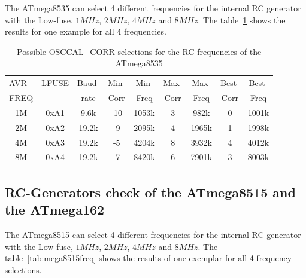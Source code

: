 The ATmega8535 can select 4 different frequencies for the internal RC generator
with the Low-fuse, \(1MHz\), \(2MHz\), \(4MHz\) and \(8MHz\).
The table~\ref{tab:mega8535freq} shows the results for one example for
all 4 frequencies.

\begin{table}[H]
  \begin{center}
    \begin{tabular}{| c | c | c || c | c || c | c || c | c |}
    \hline
             AVR\_ & LFUSE & Baud- & Min- & Min- & Max- & Max- & Best- & Best-  \\
             FREQ  &       & rate & Corr & Freq & Corr & Freq  & Corr  & Freq  \\
    \hline
    \hline
                1M & 0xA1  &  9.6k &  -10  & 1053k &  3  & 982k  & 0  & 1001k \\
    \hline
                2M & 0xA2  & 19.2k &  -9  & 2095k &  4  & 1965k & 1  & 1998k \\
    \hline
                4M & 0xA3  & 19.2k &  -5  & 4204k &  8  & 3932k & 4  & 4012k \\
    \hline
                8M & 0xA4  & 19.2k &  -7  & 8420k &  6  & 7901k & 3  & 8003k \\
    \hline
    \end{tabular}
  \end{center}
  \caption{Possible OSCCAL\_CORR selections for the RC-frequencies of the ATmega8535}
  \label{tab:mega8535freq}
\end{table}

\subsection{RC-Generators check of the ATmega8515 and the ATmega162}

The ATmega8515 can select 4 different frequencies for the internal RC generator
with the Low fuse, \(1MHz\), \(2MHz\), \(4MHz\) and \(8MHz\).
The table~\ref{tab:mega8515freq} shows the results of one exemplar 
for all 4 frequency selections.

